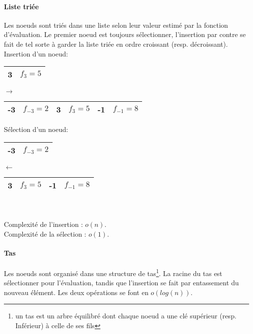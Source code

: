 \paragraph{Liste triée}
Les noeuds sont triés dans une liste selon leur valeur estimé par la fonction d’évaluation. Le premier noeud est toujours sélectionner, l’insertion par contre se fait de tel sorte à garder la liste triée en ordre croissant (resp. décroissant).\\
Insertion d'un noeud:\\
\begin{minipage}{0.5\textwidth}
	\centering
	\begin{tabular}{|c |c|}
		\hline
		3 & $f_{3}=5$\\
		\hline
	\end{tabular}
\end{minipage}
\hfillx
$\rightarrow$
\begin{minipage}{0.5\textwidth}
	\centering
	\begin{tabular}{| c| c|c | c| c| c|}
		\hline
		 -3& $f_{-3}=2$ & {\color{red}3}& {\color{red}$f_{3}=5$} & -1& $f_{-1}=8$ \\\hline
	\end{tabular}
\end{minipage}

Sélection d'un noeud:\\
\begin{minipage}{0.5\textwidth}
	\centering
	\begin{tabular}{|c |c|}
		\hline
		{\color{red}-3} & {\color{red}$f_{-3}=2$}\\
		\hline
	\end{tabular}
\end{minipage}
\hfillx
$\leftarrow$
\begin{minipage}{0.5\textwidth}
	\centering
	\begin{tabular}{|c | c| c| c|}
		\hline
		3& $f_{3}=5$ & -1& $f_{-1}=8$ \\\hline
	\end{tabular}
\end{minipage}\\~\\
Complexité de l’insertion : $o(n)$.\\
Complexité de la sélection : $o(1)$.\\


\paragraph{Tas}
Les noeuds sont organisé dans une structure de tas\footnote{un tas est un arbre équilibré dont chaque noeud a une clé supérieur (resp. Inférieur) à celle de ses fils}. La racine du tas est sélectionner pour l’évaluation, tandis que l’insertion se fait par entassement du nouveau élément. Les deux opérations se font en $o(log(n))$.

